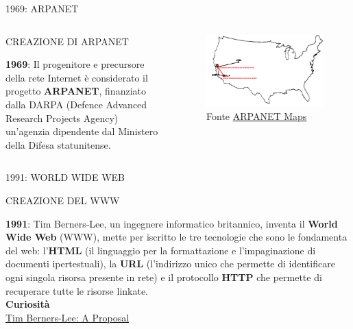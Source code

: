 \documentclass[aspectratio=1610]{beamer}
\begin{document}
\begin{frame}{1969: ARPANET}
    \begin{columns}
            \begin{alertblock}{CREAZIONE DI ARPANET}
                \begin{minipage}{0.98\linewidth}
                    \justifying
                    \textbf{1969}: Il progenitore e precursore della rete Internet è considerato il progetto \textbf{ARPANET}, finanziato dalla 
                    DARPA (Defence Advanced Research Projects Agency) un'agenzia dipendente dal Ministero della Difesa statunitense.\\
                \end{minipage}
            \end{alertblock}
            \begin{figure}
                \includegraphics[width=\linewidth]{img/arpanet.png}
                \caption{{Fonte \href{http://mercury.lcs.mit.edu/~jnc/tech/arpageo.html}{ARPANET Maps}}}
            \end{figure}
    \end{columns}
\end{frame}

\begin{frame}{1991: WORLD WIDE WEB}
    \begin{alertblock}{CREAZIONE DEL WWW}
        \begin{minipage}{0.98\linewidth}
            \justifying
            \textbf{1991}: Tim Berners-Lee, un ingegnere informatico britannico, inventa il \textbf{World Wide Web} (WWW), mette per 
            iscritto le tre tecnologie che sono le fondamenta del web: l’\textbf{HTML} (il linguaggio per la formattazione e 
            l’impaginazione di documenti ipertestuali), la \textbf{URL} (l’indirizzo unico che permette di identificare ogni singola 
            risorsa presente in rete) e il protocollo \textbf{HTTP} che permette di recuperare tutte le risorse linkate.\\
            \bigskip
            \tiny{\textbf{Curiosità}}\\
            \tiny{\href{https://www.w3.org/History/1989/proposal.html}{Tim Berners-Lee: A Proposal}}
        \end{minipage}
    \end{alertblock}
\end{frame}
\end{document}
